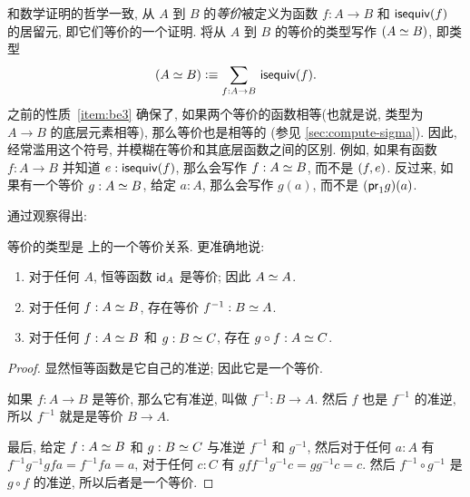 和数学证明的哲学一致,
%
从 $A$ 到 $B$ 的\emph{等价}被定义为函数 $f:A\to B$ 和 $\isequiv (f)$ 的居留元, 即它们等价的一个证明.
将从 $A$ 到 $B$ 的等价的类型写作 $(\eqv A B)$, 即类型
\begin{equation}
    \label{eq:eqv}
    (\eqv A B) \defeq \sm{f:A\to B} \isequiv(f).
\end{equation}
之前的性质~\ref{item:be3} 确保了, 如果两个等价的函数相等(也就是说, 类型为 $A\to B$ 的底层元素相等), 那么等价也是相等的 (参见 \cref{sec:compute-sigma}).
因此, 经常滥用这个符号, 并模糊在等价和其底层函数之间的区别.
例如, 如果有函数 $f:A\to B$ 并知道 $e:\isequiv(f)$, 那么会写作 $f:\eqv A B$, 而不是 $\tup{f}{e}$.
反过来, 如果有一个等价 $g:\eqv A B$, 给定 $a:A$, 那么会写作 $g(a)$, 而不是 $(\proj1 g)(a)$.

通过观察得出:

\begin{lem}
    \label{thm:equiv-eqrel}
    等价的类型是 \type 上的一个等价关系.
    更准确地说:
    \begin{enumerate}
        \item 对于任何 $A$, 恒等函数 $\idfunc[A]$ 是等价; 因此 $\eqv A A$.
        \item 对于任何 $f:\eqv A B$, 存在等价 $f^{-1} : \eqv B A$.
        \item 对于任何 $f:\eqv A B$ 和 $g:\eqv B C$, 存在 $g\circ f : \eqv A C$.
    \end{enumerate}
\end{lem}
\begin{proof}
    显然恒等函数是它自己的准逆; 因此它是一个等价.

    如果 $f:A\to B$ 是等价, 那么它有准逆, 叫做 $f^{-1}:B\to A$.
    然后 $f$ 也是 $f^{-1}$ 的准逆, 所以 $f^{-1}$ 就是是等价 $B\to A$.

    最后, 给定 $f:\eqv A B$ 和 $g:\eqv B C$ 与准逆 $f^{-1}$ 和 $g^{-1}$, 然后对于任何 $a:A$ 有 $f^{-1} g^{-1} g f a = f^{-1} f a = a$, 对于任何 $c:C$ 有 $g f f^{-1} g^{-1} c = g g^{-1} c = c$.
    然后 $f^{-1} \circ g^{-1}$ 是 $g\circ f$ 的准逆, 所以后者是一个等价.
\end{proof}

%